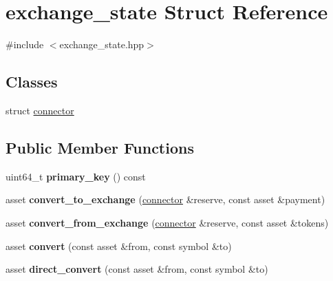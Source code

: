 \hypertarget{structexchange__state}{}\section{exchange\+\_\+state Struct Reference}
\label{structexchange__state}


{\ttfamily \#include $<$exchange\+\_\+state.\+hpp$>$}

\subsection*{Classes}
\begin{DoxyCompactItemize}
\item 
struct \mbox{\hyperlink{structexchange__state_1_1connector}{connector}}
\end{DoxyCompactItemize}
\subsection*{Public Member Functions}
\begin{DoxyCompactItemize}
\item 
\mbox{\label{structexchange__state_a7891948a4c98433065f6297a846770b4}} 
uint64\+\_\+t {\bfseries primary\+\_\+key} () const
\item 
\mbox{\label{structexchange__state_afdd3a7968aaae22c287e2301f12df8fc}} 
asset {\bfseries convert\+\_\+to\+\_\+exchange} (\mbox{\hyperlink{structexchange__state_1_1connector}{connector}} \&reserve, const asset \&payment)
\item 
\mbox{\label{structexchange__state_a90c01b5b89955787029f151a6c4b134a}} 
asset {\bfseries convert\+\_\+from\+\_\+exchange} (\mbox{\hyperlink{structexchange__state_1_1connector}{connector}} \&reserve, const asset \&tokens)
\item 
\mbox{\label{structexchange__state_abbf59e6671e0432040e20caae7006c54}} 
asset {\bfseries convert} (const asset \&from, const symbol \&to)
\item 
\mbox{\label{structexchange__state_ab5c2f70f8e3de76e8fdc5ebcabedb4cc}} 
asset {\bfseries direct\+\_\+convert} (const asset \&from, const symbol \&to)
\end{DoxyCompactItemize}
